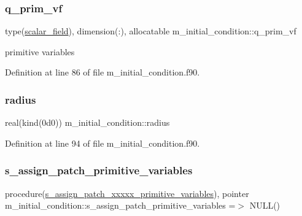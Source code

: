 \subsubsection{\texorpdfstring{q\+\_\+prim\+\_\+vf}{q\_prim\_vf}}
{\footnotesize\ttfamily type(\hyperlink{structm__derived__types_1_1scalar__field}{scalar\+\_\+field}), dimension(\+:), allocatable m\+\_\+initial\+\_\+condition\+::q\+\_\+prim\+\_\+vf}



primitive variables 



Definition at line 86 of file m\+\_\+initial\+\_\+condition.\+f90.

\mbox{\label{namespacem__initial__condition_a51a6afec0ff2f62c62b6cf86bd2c16e4}} 
\subsubsection{\texorpdfstring{radius}{radius}}
{\footnotesize\ttfamily real(kind(0d0)) m\+\_\+initial\+\_\+condition\+::radius}



Definition at line 94 of file m\+\_\+initial\+\_\+condition.\+f90.

\mbox{\label{namespacem__initial__condition_a3151c58d3a628c7ac8aff34bce727867}} 
\subsubsection{\texorpdfstring{s\+\_\+assign\+\_\+patch\+\_\+primitive\+\_\+variables}{s\_assign\_patch\_primitive\_variables}}
{\footnotesize\ttfamily procedure(\hyperlink{interfacem__initial__condition_1_1s__assign__patch__xxxxx__primitive__variables}{s\+\_\+assign\+\_\+patch\+\_\+xxxxx\+\_\+primitive\+\_\+variables}), pointer m\+\_\+initial\+\_\+condition\+::s\+\_\+assign\+\_\+patch\+\_\+primitive\+\_\+variables =$>$ N\+U\+LL()}



